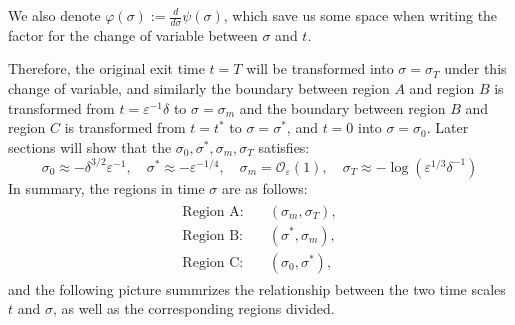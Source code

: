 \documentclass[letterpaper,11pt]{article}
\newcommand{\rmO}{\mathcal{O}}
\newcommand{\eps}{\varepsilon}
\numberwithin{equation}{section}
\theoremstyle{plain}
\begin{document}
We also denote $\varphi(\sigma) := \frac{d}{d\sigma}\psi(\sigma)$, which save us some space when writing the factor for the change of variable between $\sigma $ and $t$. 

Therefore, the original exit time $t=T$ will be transformed into $\sigma=\sigma_T$ under this change of variable, and similarly the boundary between region $A$ and region $B$ is  transformed from $t=\eps^{-1}\delta$ to $\sigma = \sigma_m$ and the boundary between region $B$ and region $C$ is  transformed from $t=t^*$ to $\sigma = \sigma^*$, and $t=0$ into $\sigma = \sigma_0$. Later sections will show that the $\sigma_0, \sigma^*, \sigma_m, \sigma_T$ satisfies:
\[
\sigma _0 \approx -\delta^{3/2}\eps^{-1}, \quad \sigma ^* \approx -\eps^{-1/4}, \quad \sigma_m = \rmO_\eps(1), \quad
\sigma_T \approx -\log(\eps^{1/3}\delta^{-1}) 
\]
In summary, the regions in time $\sigma$ are as follows:
\begin{align}\label{region_division_sig}
\begin{split}
\text{Region A:} & \quad (\sigma_m ,\sigma_T ),  \\
\text{Region B:} & \quad (\sigma^*, \sigma_m),  \\
\text{Region C:} & \quad (\sigma_0, \sigma^*),
\end{split}
\end{align}
and the following picture summrizes the relationship between the two time scales $t$ and $\sigma$, as well as the corresponding regions divided.


\iffalse
\begin{equation*}
\varphi(\sigma) =\begin{cases}
 (-\frac{3}{2}\sigma)^{-1/3}, \text{ as }\sigma \to -\infty\\
e^{-\sigma} , \text{ as }\sigma \to \infty.
\end{cases}
\end{equation*}

\begin{equation*}
u_R(\psi(\sigma)) \to \begin{cases}
 -(-\frac{3}{2}\sigma)^{1/3}, \text{ as }\sigma \to -\infty\\
e^{\sigma} , \text{ as }\sigma \to \infty.
\end{cases}
\end{equation*}

\begin{equation*}
2u_R\varphi(\sigma) \to\begin{cases}
-2+ \rmO((-\sigma)^{-3/2}), \text{ as }\sigma \to -\infty\\
2+ \rmO(e^{-2\sigma}), \text{ as }\sigma \to \infty.
\end{cases}
\end{equation*}
%
\fi
\end{document}
